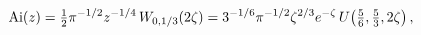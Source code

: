 \[\mathop{\mathrm{Ai}\/}\nolimits\!\left(z\right)=\tfrac{1}{2}\pi^{-1/2}z^{-1/4}%
\mathop{W_{0,1/3}\/}\nolimits\!\left(2\zeta\right)=3^{-1/6}\pi^{-1/2}\zeta^{2/%
3}e^{-\zeta}\mathop{U\/}\nolimits\!\left(\tfrac{5}{6},\tfrac{5}{3},2\zeta%
\right),\]
